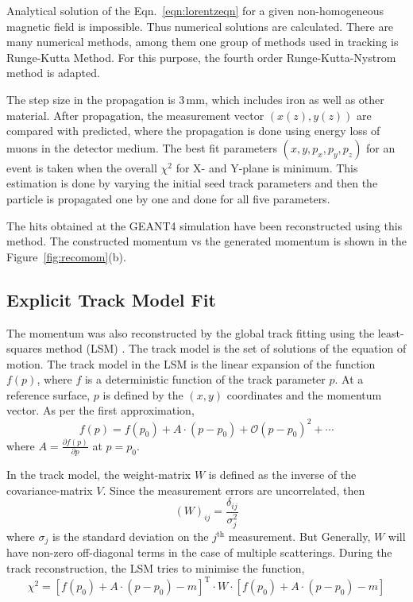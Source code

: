 Analytical solution of the Eqn.~\ref{eqn:lorentzeqn} for a given
non-homogeneous magnetic field is impossible. Thus numerical solutions
are calculated. There are many numerical methods, among them one group
of methods used in tracking is Runge-Kutta Method. For this purpose,
the fourth order Runge-Kutta-Nystrom \cite{lund2009track} method is
adapted.

The step size in the propagation is 3\,mm, which includes iron as well
as other material. After propagation, the measurement vector
$(x(z),y(z))$ are compared with predicted, where the propagation is done
using energy loss of muons in the detector medium. The best fit parameters
$(x,y,p_{x},p_{y},p_{z})$ for an event is taken when the overall
$\chi^{2}$ for X- and Y-plane is minimum. This estimation is done by
varying the initial seed track parameters and then the particle is
propagated one by one and done for all five parameters.    

The hits obtained at the GEANT4 simulation have been reconstructed
using this method. The constructed momentum vs the generated momentum
is shown in the Figure~\ref{fig:recomom}(b).

\subsection{Explicit Track Model Fit}
The momentum was also reconstructed by the global track fitting using
the least-squares method (LSM) \cite{explicit1}. The track model is
the set of solutions of the equation of motion. The track model in the
LSM is the linear expansion of the function $f\left(p\right)$, where
$f$ is a deterministic function of the track parameter $p$. At a
reference surface, $p$ is defined by the $\left(x,y\right)$
coordinates and the momentum vector. As per the first approximation,
\begin{equation}
  f\left(p\right) = f\left(p_{0}\right) + A\cdot \left(p-p_{0}\right) + \mathcal{O} \left(p-p_{0}\right)^{2}+\cdots
\end{equation}
where $A=\frac{\partial f\left(p\right)}{\partial p}$ at $p=p_{0}$.

In the track model, the weight-matrix $W$ is defined as the inverse of
the covariance-matrix $V$. Since the measurement errors are
uncorrelated, then
\begin{equation}
  \left(W\right)_{ij} = \frac{\delta_{ij}}{\sigma_{j}^{2}}
\end{equation}
where $\sigma_{j}$ is the standard deviation on the $j^{\text{th}}$
measurement. But Generally, $W$ will have non-zero off-diagonal terms
in the case of multiple scatterings. During the track reconstruction,
the LSM tries to minimise the function,
\begin{equation}
  \chi^{2} = \left[f\left(p_{0}\right)+ A\cdot \left(p-p_{0}\right) - m\right]^{\mathrm{T}} \cdot W \cdot \left[f\left(p_{0}\right)+ A\cdot \left(p-p_{0}\right) - m\right]
\end{equation}

